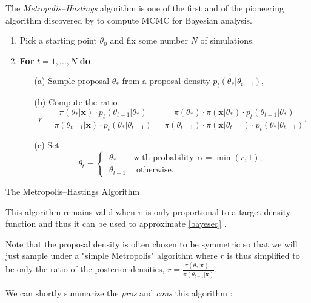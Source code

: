 \documentclass[11pt,a4paper,openany ]{book}
\begin{document}
The \emph{Metropolis–Hastings} algorithm is one of the first and of the pioneering algorithm discovered by \cite{hastings_monte_1970} to compute  MCMC for Bayesian analysis.

\begin{algorithm}[H]
	\SetAlgoLined
	\begin{enumerate}
		\item Pick a starting point $\theta_0$ and fix some number $N$ of simulations.
		\item \textbf{For} $t=1,\dots,N$ \quad \textbf{do}
		\begin{itemize}
			\item[(a)] Sample proposal $\theta_*$ from a proposal density $p_t(\theta_*|\theta_{t-1})$,
			\item[(b)] Compute the ratio
			\begin{equation*}
			r = \frac{\pi(\theta_*|\boldsymbol{x})\cdot p_t(\theta_{t-1}|\theta_*)}{\pi(\theta_{t-1}|\boldsymbol{x})\cdot p_t(\theta_*|\theta_{t-1})} = \frac{\pi(\theta_*)\cdot \pi(\boldsymbol{x}|\theta_*)\cdot p_t(\theta_{t-1}|\theta_*)}{\pi(\theta_{t-1})\cdot \pi(\boldsymbol{x}|\theta_{t-1})\cdot p_t(\theta_*|\theta_{t-1})}.
			\end{equation*}
			\item[(c)] Set 
			\begin{equation*}
			\theta_t= 			\begin{cases} \ \theta_* \qquad \text{with probability} \ \  \alpha=\min (r,1); \\
			\ \theta_{t-1} \ \quad \text{otherwise}.
			\end{cases}
			\end{equation*}
		\end{itemize}
	\end{enumerate}
	\caption{The Metropolis–Hastings Algorithm}
\end{algorithm}


This algorithm remains valid when $\pi$ is only proportional to a target density function and thus it can be used to approximate \ref{bayeseq} . 

Note that the proposal density is often chosen to be symmetric so that we will just sample under a "simple Metropolis" algorithm where $r$ is thus simplified to be only the ratio of the posterior densities, $r=\frac{\pi(\theta_*|\boldsymbol{x})\cdot }{\pi(\theta_{t-1}|\boldsymbol{x})}$.

We can shortly summarize the \emph{pros} and \emph{cons} this algorithm :
\end{document}
